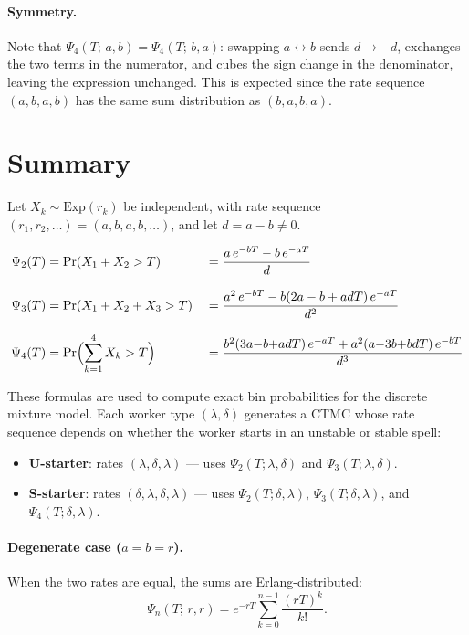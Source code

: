\documentclass[11pt,a4paper]{article}
\begin{document}
\paragraph{Symmetry.} Note that $\Psi_4(T;\,a,b) = \Psi_4(T;\,b,a)$:
swapping $a \leftrightarrow b$ sends $d \to -d$, exchanges the two terms in the
numerator, and cubes the sign change in the denominator, leaving the
expression unchanged.  This is expected since the rate sequence $(a,b,a,b)$
has the same sum distribution as $(b,a,b,a)$.

\section{Summary}

Let $X_k \sim \text{Exp}(r_k)$ be independent, with rate sequence
$(r_1, r_2, \ldots) = (a, b, a, b, \ldots)$, and let $d = a - b \neq 0$.

\begin{align}
  \Psi_2(T) &= \Pr(X_1 + X_2 > T) &&= \frac{a\,e^{-bT} - b\,e^{-aT}}{d} \label{eq:s2}\\[8pt]
  \Psi_3(T) &= \Pr(X_1 + X_2 + X_3 > T) &&= \frac{a^2\,e^{-bT} - b(2a - b + adT)\,e^{-aT}}{d^2} \label{eq:s3}\\[8pt]
  \Psi_4(T) &= \Pr\Bigl(\sum_{k=1}^4 X_k > T\Bigr) &&= \frac{b^2(3a{-}b{+}adT)\,e^{-aT} + a^2(a{-}3b{+}bdT)\,e^{-bT}}{d^3} \label{eq:s4}
\end{align}

These formulas are used to compute exact bin probabilities for the discrete
mixture model.  Each worker type $(\lambda, \delta)$ generates a CTMC whose
rate sequence depends on whether the worker starts in an unstable or stable
spell:
\begin{itemize}[nosep]
  \item \textbf{U-starter}: rates $(\lambda, \delta, \lambda)$ --- uses $\Psi_2(T;\lambda,\delta)$ and $\Psi_3(T;\lambda,\delta)$.
  \item \textbf{S-starter}: rates $(\delta, \lambda, \delta, \lambda)$ --- uses $\Psi_2(T;\delta,\lambda)$, $\Psi_3(T;\delta,\lambda)$, and $\Psi_4(T;\delta,\lambda)$.
\end{itemize}

\paragraph{Degenerate case ($a = b = r$).}
When the two rates are equal, the sums are Erlang-distributed:
\[
  \Psi_n(T;\, r, r) = e^{-rT} \sum_{k=0}^{n-1} \frac{(rT)^k}{k!}.
\]
\end{document}
